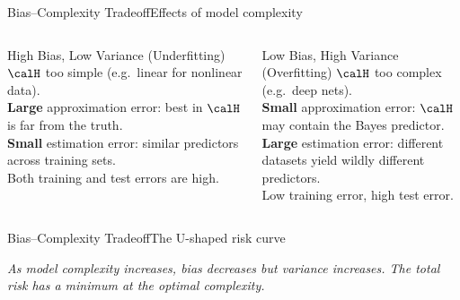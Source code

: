\begin{frame}{Bias–Complexity Tradeoff}{Effects of model complexity}
  \begin{columns}[T]
    \begin{alertblock}{High Bias, Low Variance (Underfitting)}
      $\calH$ too simple (e.g.\ linear for nonlinear data).\\[4pt]
      \textbf{Large} approximation error: best in $\calH$ is far from the truth.\\[4pt]
      \textbf{Small} estimation error: similar predictors across training sets.\\[4pt]
      Both training and test errors are high.
    \end{alertblock}
    \begin{alertblock}{Low Bias, High Variance (Overfitting)}
      $\calH$ too complex (e.g.\ deep nets).\\[4pt]
      \textbf{Small} approximation error: $\calH$ may contain the Bayes predictor.\\[4pt]
      \textbf{Large} estimation error: different datasets yield wildly different predictors.\\[4pt]
      Low training error, high test error.
    \end{alertblock}
  \end{columns}
\end{frame}

\begin{frame}{Bias–Complexity Tradeoff}{The U-shaped risk curve}
  \begin{center}
  \end{center}
  {\footnotesize\textit{As model complexity increases, bias decreases but variance increases.
  The total risk has a minimum at the optimal complexity.}}
\end{frame}

